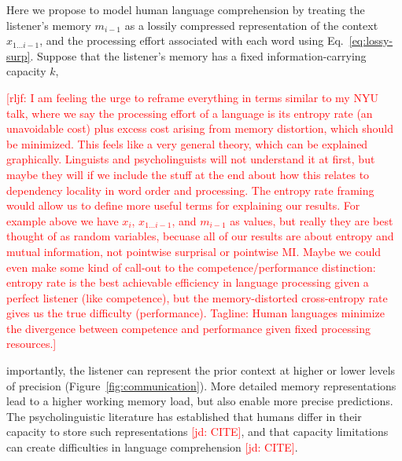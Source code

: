 \documentclass[12pt]{article}
\newcommand{\jd}[1]{\textcolor{Red}{[jd: #1]}}
\newcommand{\rljf}[1]{\textcolor{Red}{[rljf: #1]}}
\begin{document}
Here we propose to model human language comprehension by treating the listener's memory $m_{i-1}$ as a lossily compressed representation of the context $x_{1...i-1}$, and the processing effort associated with each word using Eq.~\ref{eq:lossy-surp}. Suppose that the listener's memory has a fixed information-carrying capacity $k$,


\rljf{I am feeling the urge to reframe everything in terms similar to my NYU talk, where we say the processing effort of a language is its entropy rate (an unavoidable cost) plus excess cost arising from memory distortion, which should be minimized. This feels like a very general theory, which can be explained graphically. Linguists and psycholinguists will not understand it at first, but maybe they will if we include the stuff at the end about how this relates to dependency locality in word order and processing. The entropy rate framing would allow us to define more useful terms for explaining our results. For example above we have $x_i$, $x_{1...i-1}$, and $m_{i-1}$ as values, but really they are best thought of as random variables, becuase all of our results are about entropy and mutual information, not pointwise surprisal or pointwise MI. Maybe we could even make some kind of call-out to the competence/performance distinction: entropy rate is the best achievable efficiency in language processing given a perfect listener (like competence), but the memory-distorted cross-entropy rate gives us the true difficulty (performance). Tagline: Human languages minimize the divergence between competence and performance given fixed processing resources.}





importantly, the listener can represent the prior context at higher or lower levels of precision (Figure~\ref{fig:communication}).
More detailed memory representations lead to a higher working memory load, but also enable more precise predictions.
The psycholinguistic literature has established that humans differ in their capacity to store such representations \jd{CITE}, and that capacity limitations can create difficulties in language comprehension \jd{CITE}.
\end{document}
